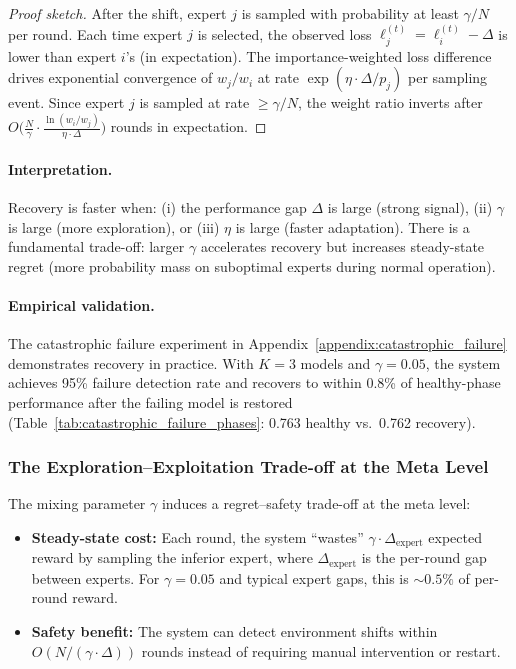 \begin{proof}[Proof sketch]
After the shift, expert $j$ is sampled with probability at least $\gamma / N$
per round.  Each time expert $j$ is selected, the observed loss
$\ell_j^{(t)} = \ell_i^{(t)} - \Delta$ is lower than expert $i$'s (in
expectation).  The importance-weighted loss difference drives exponential
convergence of $w_j / w_i$ at rate $\exp(\eta \cdot \Delta / p_j)$ per
sampling event.  Since expert $j$ is sampled at rate $\geq \gamma / N$, the
weight ratio inverts after $O\!\bigl(\frac{N}{\gamma} \cdot
\frac{\ln(w_i / w_j)}{\eta \cdot \Delta}\bigr)$ rounds in expectation.
\end{proof}

\paragraph{Interpretation.}
Recovery is faster when: (i) the performance gap $\Delta$ is large (strong
signal), (ii) $\gamma$ is large (more exploration), or (iii) $\eta$ is large
(faster adaptation).  There is a fundamental trade-off: larger $\gamma$
accelerates recovery but increases steady-state regret (more probability
mass on suboptimal experts during normal operation).

\paragraph{Empirical validation.}
The catastrophic failure experiment in
Appendix~\ref{appendix:catastrophic_failure} demonstrates recovery in practice.
With $K=3$ models and $\gamma = 0.05$, the system achieves 95\% failure
detection rate and recovers to within 0.8\% of healthy-phase performance after
the failing model is restored (Table~\ref{tab:catastrophic_failure_phases}:
0.763 healthy vs.\ 0.762 recovery).

\subsubsection{The Exploration--Exploitation Trade-off at the Meta Level}

The mixing parameter $\gamma$ induces a regret--safety trade-off at the meta level:

\begin{itemize}[leftmargin=*,noitemsep]
    \item \textbf{Steady-state cost:} Each round, the system ``wastes''
    $\gamma \cdot \Delta_{\text{expert}}$ expected reward by sampling the
    inferior expert, where $\Delta_{\text{expert}}$ is the per-round gap
    between experts.  For $\gamma = 0.05$ and typical expert gaps, this is
    ${\sim}0.5\%$ of per-round reward.
    
    \item \textbf{Safety benefit:} The system can detect environment shifts
    within $O(N / (\gamma \cdot \Delta))$ rounds instead of requiring manual
    intervention or restart.
\end{itemize}

